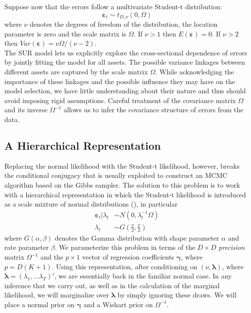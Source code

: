 Suppose now that the errors follow a multivariate Student-t distribution: 
\begin{equation*}
\boldsymbol{\varepsilon}_{t}\sim t_{D,\nu }\left( 0,\Omega \right)
\end{equation*}
where $\nu$ denotes the degrees of freedom of the distribution, the location parameter is zero and the scale matrix is $\Omega$.
If $\nu >1$ then $E(\boldsymbol{\varepsilon}) = 0$. 
If $\nu>2$ then $Var\left( \boldsymbol{\varepsilon} \right) = \nu \Omega/(\nu-2)$. \\
The SUR model lets us explicitly explore the cross-sectional dependence of errors by jointly fitting the model for all assets. 
The possible variance linkages between different assets are captured by the scale matrix $\Omega$. 
While acknowledging the importance of these linkages and the possible influence they may have on the model selection, we have little understanding about their nature and thus should avoid imposing rigid assumptions. 
Careful treatment of the covariance matrix $\Omega$ and its inverse $\Omega^{-1}$ allows us to infer the covariance structure of errors from the data.

\subsection{A Hierarchical Representation}
Replacing the normal likelihood with the Student-t likelihood, however, breaks the conditional conjugacy that is usually exploited to construct an MCMC algorithm based on the Gibbs sampler.
The solution to this problem is to work with a hierarchical representation in which the Student-t likelihood is introduced as a scale mixture of normal distributions (\cite{chib1995hierarchical}), in particular
\begin{align*}
\boldsymbol{\varepsilon}_{t}|\lambda _{t} &\sim N\left( 0,\lambda _{t}^{-1}\Omega \right)
\\
\lambda _{t} &\sim G\left( \frac{\nu }{2},\frac{\nu }{2}\right)
\end{align*}
where $G(\alpha,\beta)$ denotes the Gamma distribution with shape parameter $\alpha$ and rate parameter $\beta$. 
We parameterize this problem in terms of the $D\times D$ \emph{precision} matrix $\Omega^{-1}$ and the $p\times1$ vector of regression coefficients $\boldsymbol{\gamma}$, where $p = D(K+1)$. 
Using this representation, after conditioning on $\left( \nu, \boldsymbol{\lambda} \right)$, where $\boldsymbol{\lambda} = (\lambda_1, \dots \lambda_T)'$, we are essentially back in the familiar normal case.
In any inference that we carry out, as well as in the calculation of the marginal likelihood, we will marginalize over $\boldsymbol{\lambda}$ by simply ignoring these draws.
We will place a normal prior on $\boldsymbol{\gamma}$ and a Wishart prior on $\Omega^{-1}$. 

